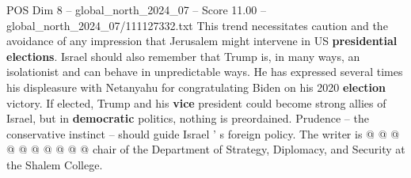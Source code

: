 \begin{textsample}{POS Dim 8 – global\_north\_2024\_07 – Score 11.00 – global\_north\_2024\_07/111127332.txt}
This trend necessitates caution and the avoidance of any impression that Jerusalem might intervene in US \textbf{presidential} \textbf{elections}.
Israel should also remember that Trump is, in many ways, an isolationist and can behave in unpredictable ways.
He has expressed several times his displeasure with Netanyahu for congratulating Biden on his 2020 \textbf{election} victory.
If elected, Trump and his \textbf{vice} president could become strong allies of Israel, but in \textbf{democratic} politics, nothing is preordained.
Prudence -- the conservative instinct -- should guide Israel ' s foreign policy.
The writer is @ @ @ @ @ @ @ @ @ @ chair of the Department of Strategy, Diplomacy, and Security at the Shalem College.

\end{textsample}
